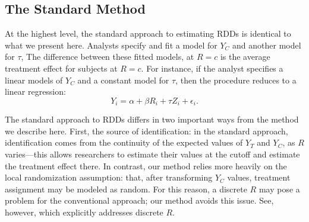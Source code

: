 \documentclass[12pt]{article}
\newcommand{\E}{\mathbb{E}}
\begin{document}
\subsection{The Standard Method}
At the highest level, the standard approach to estimating RDDs is identical to what we present here.
Analysts specify and fit a model for $Y_C$ and another model for $\tau$,
The difference between these fitted models, at $R=c$ is the average treatment effect for subjects at $R=c$.
For instance, if the analyst specifies a linear models of $Y_C$ and a constant model for $\tau$, then the procedure reduces to a linear regression:
\begin{equation}\label{standard}
Y_i=\alpha+\beta R_i+\tau Z_i+\epsilon_i.
\end{equation}
\begin{comment}
Researchers skeptical of the linear model can add polynomial $R$ terms, and those skeptical of the constant model for $\tau$ can interact $R$ with $Z$.
\citet{hahn2001iae} show that, under appropriate continuity assumptions, the following estimand is nonparametrically identified:
\begin{equation}\label{late}
\lim_{b\rightarrow 0} \E[Y_T|R\in c\pm b]-\E[Y_C|R\in c\pm b]
\end{equation}
that is, the average treatment effect in the infinitesimal window surrounding $c$.
If researchers can estimate the respective limits of the functions of $r$, $\E[Y_T|R=r]$ and $\E[Y_C|R=r]$, then the difference between their limits, as $r\rightarrow c$ is equal to the estimand (\ref{late}).
To this effect, \citet{porter2003estimation} suggested using local linear regression to estimate the limits, and \citet{imbens2012optimal} and \citet{desjardins2008impact} have provided optimal bandwidths for the local linear regression.
In fact, \citet{imbens2008regression} pointed out that regressing $Y$ on $R$, $Z$, and $R:Z$, using only data in a window around the cutoff, is similar in spirit, nearly as good, and substantially easier than the estimator in \citet{porter2003estimation}.
\end{comment}

The standard approach to RDDs differs in two important ways from the method we describe here.
First, the source of identification: in the standard approach, identification comes from the continuity of the expected values of $Y_T$ and $Y_C$, as $R$ varies---this allows researchers to estimate their values at the cutoff and estimate the treatment effect there.
In contrast, our method relies more heavily on the local randomization assumption: that, after transforming $Y_C$ values, treatment assignment may be modeled as random.
For this reason, a discrete $R$ may pose a problem for the
conventional approach; our method avoids this issue.
See, however, \citet{lee2008regression} which explicitly addresses
discrete $R$.
\end{document}
